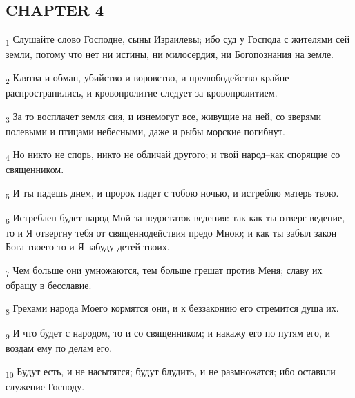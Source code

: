 \subsection{CHAPTER 4}
\begin{tcolorbox}
\textsubscript{1} Слушайте слово Господне, сыны Израилевы; ибо суд у Господа с жителями сей земли, потому что нет ни истины, ни милосердия, ни Богопознания на земле.
\end{tcolorbox}
\begin{tcolorbox}
\textsubscript{2} Клятва и обман, убийство и воровство, и прелюбодейство крайне распространились, и кровопролитие следует за кровопролитием.
\end{tcolorbox}
\begin{tcolorbox}
\textsubscript{3} За то восплачет земля сия, и изнемогут все, живущие на ней, со зверями полевыми и птицами небесными, даже и рыбы морские погибнут.
\end{tcolorbox}
\begin{tcolorbox}
\textsubscript{4} Но никто не спорь, никто не обличай другого; и твой народ--как спорящие со священником.
\end{tcolorbox}
\begin{tcolorbox}
\textsubscript{5} И ты падешь днем, и пророк падет с тобою ночью, и истреблю матерь твою.
\end{tcolorbox}
\begin{tcolorbox}
\textsubscript{6} Истреблен будет народ Мой за недостаток ведения: так как ты отверг ведение, то и Я отвергну тебя от священнодействия предо Мною; и как ты забыл закон Бога твоего то и Я забуду детей твоих.
\end{tcolorbox}
\begin{tcolorbox}
\textsubscript{7} Чем больше они умножаются, тем больше грешат против Меня; славу их обращу в бесславие.
\end{tcolorbox}
\begin{tcolorbox}
\textsubscript{8} Грехами народа Моего кормятся они, и к беззаконию его стремится душа их.
\end{tcolorbox}
\begin{tcolorbox}
\textsubscript{9} И что будет с народом, то и со священником; и накажу его по путям его, и воздам ему по делам его.
\end{tcolorbox}
\begin{tcolorbox}
\textsubscript{10} Будут есть, и не насытятся; будут блудить, и не размножатся; ибо оставили служение Господу.
\end{tcolorbox}
